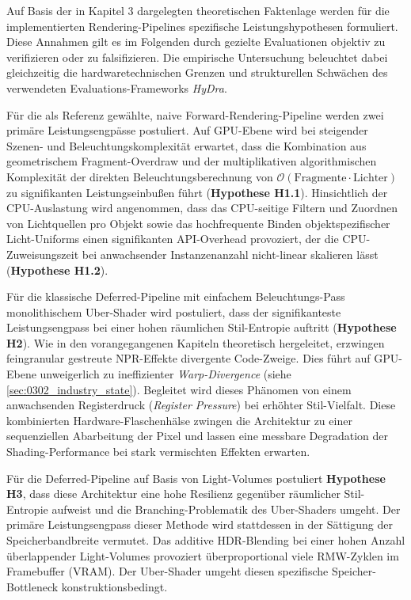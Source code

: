 Auf Basis der in Kapitel 3 dargelegten theoretischen Faktenlage werden für die implementierten Rendering-Pipelines
spezifische Leistungshypothesen formuliert.
Diese Annahmen gilt es im Folgenden durch gezielte Evaluationen objektiv zu verifizieren oder zu falsifizieren.
Die empirische Untersuchung beleuchtet dabei gleichzeitig die hardwaretechnischen Grenzen und strukturellen Schwächen
des verwendeten Evaluations-Frameworks \textit{HyDra}.

Für die als Referenz gewählte, naive Forward-Rendering-Pipeline werden zwei primäre Leistungsengpässe postuliert.
Auf \ac{GPU}-Ebene wird bei steigender Szenen- und Beleuchtungskomplexität erwartet, dass die Kombination aus
geometrischem Fragment-Overdraw und der multiplikativen algorithmischen Komplexität der direkten
Beleuchtungsberechnung von $\mathcal{O}(\text{Fragmente} \cdot \text{Lichter})$ zu signifikanten Leistungseinbußen führt
(\hypertarget{hyp:H1.1}{\textbf{Hypothese H1.1}}).
Hinsichtlich der \ac{CPU}-Auslastung wird angenommen, dass das \ac{CPU}-seitige Filtern und Zuordnen von Lichtquellen
pro Objekt sowie das hochfrequente Binden objektspezifischer Licht-Uniforms einen signifikanten \ac{API}-Overhead
provoziert, der die \ac{CPU}-Zuweisungszeit bei anwachsender Instanzenanzahl nicht-linear skalieren lässt
(\hypertarget{hyp:H1.2}{\textbf{Hypothese H1.2}}).

Für die klassische Deferred-Pipeline mit einfachem Beleuchtungs-Pass monolithischem Uber-Shader wird postuliert, dass
der signifikanteste Leistungsengpass bei einer hohen räumlichen Stil-Entropie auftritt
(\hypertarget{hyp:H2}{\textbf{Hypothese H2}}).
Wie in den vorangegangenen Kapiteln theoretisch hergeleitet, erzwingen feingranular gestreute \ac{NPR}-Effekte divergente
Code-Zweige.
Dies führt auf \ac{GPU}-Ebene unweigerlich zu ineffizienter \textit{Warp-Divergence} (siehe
\ref{sec:0302_industry_state}).
Begleitet wird dieses Phänomen von einem anwachsenden Registerdruck (\textit{Register Pressure}) bei erhöhter
Stil-Vielfalt.
Diese kombinierten Hardware-Flaschenhälse zwingen die Architektur zu einer sequenziellen Abarbeitung der Pixel und
lassen eine messbare Degradation der Shading-Performance bei stark vermischten Effekten erwarten.

Für die Deferred-Pipeline auf Basis von Light-Volumes postuliert \hypertarget{hyp:H3}{\textbf{Hypothese H3}}, dass diese
Architektur eine hohe Resilienz gegenüber räumlicher Stil-Entropie aufweist und die Branching-Problematik des Uber-Shaders umgeht.
Der primäre Leistungsengpass dieser Methode wird stattdessen in der Sättigung der Speicherbandbreite vermutet.
Das additive \ac{HDR}-Blending bei einer hohen Anzahl überlappender Light-Volumes provoziert überproportional viele
\ac{RMW}-Zyklen im Framebuffer (\ac{VRAM}).
Der Uber-Shader umgeht diesen spezifische Speicher-Bottleneck konstruktionsbedingt.


